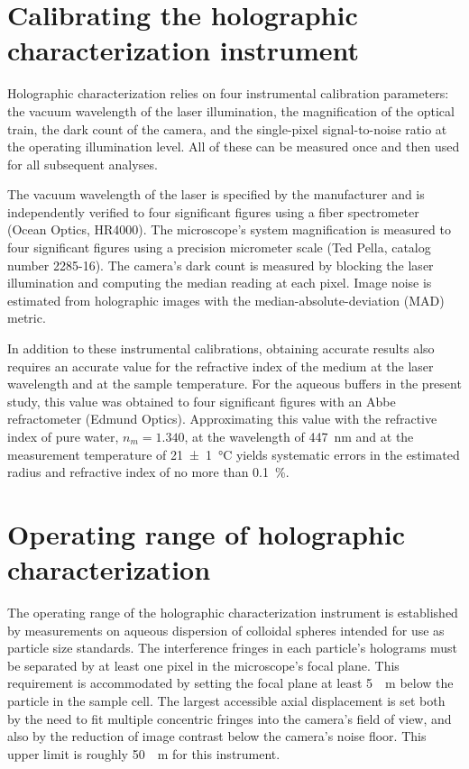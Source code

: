 \section{Calibrating the holographic characterization instrument}

Holographic characterization relies on four instrumental calibration
parameters: the vacuum wavelength of the laser illumination,
the magnification of the optical train, the dark count of the camera,
and the single-pixel signal-to-noise ratio at the operating
illumination level.
All of these can be measured once and then used for all
subsequent analyses.

The vacuum wavelength of the laser is specified by the manufacturer
and is independently verified to four significant figures using
a fiber spectrometer (Ocean Optics, HR4000).
The microscope's system magnification is measured to four
significant figures using a precision micrometer scale
(Ted Pella, catalog number 2285-16).
The camera's dark count is measured by blocking the laser
illumination and computing the median reading at each
pixel.
Image noise is estimated from holographic images with
the median-absolute-deviation (MAD) metric.

In addition to these instrumental calibrations, obtaining accurate
results also requires an accurate value for the refractive index of
the medium at the laser wavelength and at the sample temperature.
For the aqueous buffers in the present study, this value was obtained
to four significant figures with an Abbe refractometer (Edmund
Optics).  Approximating this value with the refractive index of
pure water, $n_m = \num{1.340}$, at the wavelength of \SI{447}{\nm} 
and at the measurement temperature
of \SI{21 \pm 1}{\degreeCelsius} yields systematic errors in the estimated radius and refractive index of no more than
\SI{0.1}{\percent}.

\section{Operating range of holographic characterization}

The operating range of the holographic characterization instrument is 
established by measurements on aqueous dispersion of
colloidal spheres intended for use as particle size standards.
The interference fringes in each particle's holograms must
be separated by at least one pixel in the microscope's focal plane.
This requirement is accommodated by setting the focal plane at least 
\SI{5}{\mu m} below the particle in the sample cell. The largest accessible axial displacement is set both by the need to fit multiple concentric fringes into the camera's field of view, and also by the reduction of image contrast below the camera's noise floor. This upper limit is roughly \SI{50}{\mu m} for this instrument.

